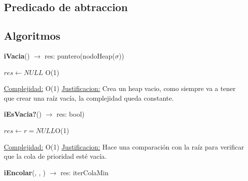 \begin{Representacion}
\subsection{Predicado de abtraccion}




\subsection{Algoritmos}

\begin{Algoritmos}

\begin{algorithm}[H]{\textbf{iVacia}() $\to$ res: puntero(nodoHeap($\sigma$))}
	\begin{algorithmic}[1]
		\State $res \gets NULL$ \Comment O(1)
		
		\medskip
		\Statex \underline{Complejidad:} O(1)
			\Statex \underline{Justificacion:} Crea un heap vacio, como siempre va a tener que crear una raíz vacía, la complejidad queda constante.
	\end{algorithmic}
\end{algorithm}


\begin{algorithm}[H]{\textbf{iEsVacia?}() $\to$ res: bool)}
	\begin{algorithmic}[1]
		\State $res \gets r = NULL$\Comment O(1)
		
		\medskip
		\Statex \underline{Complejidad:} O(1)
			\Statex \underline{Justificacion:} Hace una comparación con la raíz para verificar que la cola de prioridad esté vacía.
	\end{algorithmic}
\end{algorithm}

\begin{algorithm}[H]{\textbf{iEncolar}(, , ) $\to$ res: iterColaMin}
	\begin{algorithmic}[1]


\end{algorithmic}
\end{algorithm}
\end{Algoritmos}
\end{Representacion}
